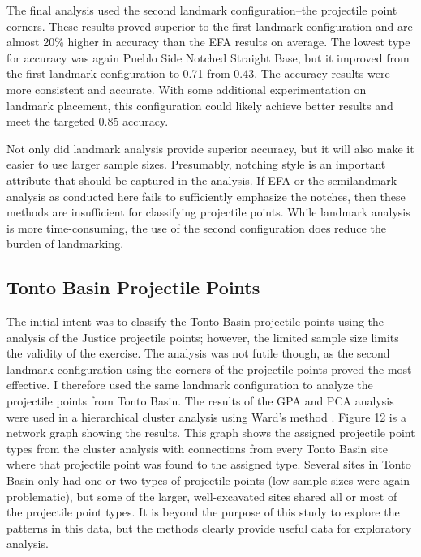 \documentclass[a4paper]{article}
\begin{document}
The final analysis used the second landmark configuration--the projectile point corners. These results proved superior to the first landmark configuration and are almost 20\% higher in accuracy than the EFA results on average. The lowest type for accuracy was again Pueblo Side Notched Straight Base, but it improved from the first landmark configuration to 0.71 from 0.43. The accuracy results were more consistent and accurate. With some additional experimentation on landmark placement, this configuration could likely achieve better results and meet the targeted 0.85 accuracy.

Not only did landmark analysis provide superior accuracy, but it will also make it easier to use larger sample sizes. Presumably, notching style is an important attribute that should be captured in the analysis. If EFA or the semilandmark analysis as conducted here fails to sufficiently emphasize the notches, then these methods are insufficient for classifying projectile points. While landmark analysis is more time-consuming, the use of the second configuration does reduce the burden of landmarking.

\hypertarget{tonto-basin-projectile-points-1}{%
\subsection*{Tonto Basin Projectile Points}\label{tonto-basin-projectile-points-1}}

The initial intent was to classify the Tonto Basin projectile points using the analysis of the Justice projectile points; however, the limited sample size limits the validity of the exercise. The analysis was not futile though, as the second landmark configuration using the corners of the projectile points proved the most effective. I therefore used the same landmark configuration to analyze the projectile points from Tonto Basin. The results of the GPA and PCA analysis were used in a hierarchical cluster analysis using Ward's method \autocite[see][]{Murtagh2014-mb}. Figure 12 is a network graph showing the results. This graph shows the assigned projectile point types from the cluster analysis with connections from every Tonto Basin site where that projectile point was found to the assigned type. Several sites in Tonto Basin only had one or two types of projectile points (low sample sizes were again problematic), but some of the larger, well-excavated sites shared all or most of the projectile point types. It is beyond the purpose of this study to explore the patterns in this data, but the methods clearly provide useful data for exploratory analysis.
\end{document}
